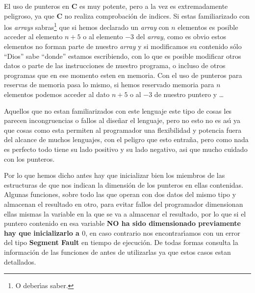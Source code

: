 El uso de punteros en \textbf{C} es muy potente, pero a la vez es extremadamente
peligroso, ya que \textbf{C} no realiza comprobaci\'on de indices. Si estas
familiarizado con los \emph{arrays} sabras\footnote{O deber\'{\i}as saber.} que
si hemos declarado un \emph{array} con $n$ elementos es posible acceder al
elemento $n+5$ o al elemento $-3$ del \emph{array}, como es obvio estos
elementos no forman parte de nuestro \emph{array} y si modificamos su contenido
s\'olo ``Dios'' sabe ``donde'' estamos escribiendo, con lo que es posible 
modificar otros datos o parte de las instrucciones de nuestro programa, o
incluso de otros programas que en ese momento esten en memoria. Con el uso
de punteros para reservas de memoria pasa lo mismo, si hemos reservado memoria
para $n$ elementos podemos acceder al dato $n+5$ o al $-3$ de nuestro puntero y
\dots \newline

Aquellos que no estan familiarizados con este lenguaje este tipo de cosas les
parecen incongruencias o fallos al dise\~nar el lenguaje, pero no esto no es
as\'{\i} ya que cosas como esta permiten al programador una flexibilidad y
potencia fuera del alcance de muchos lenguajes, con el peligro que esto 
entra\~na, pero como nada es perfecto todo tiene su lado positivo y su lado
negativo, asi que mucho cuidado con los punteros.\newline

Por lo que hemos dicho antes hay que inicializar bien los miembros de las
estructuras de \BI que nos indican la dimensi\'on de los punteros en ellas
contenidas. Algunas funciones, sobre todo las que operan con dos datos del
mismo tipo y almacenan el resultado en otro, para evitar fallos del programador
dimensionan ellas mismas la variable en la que se va a almacenar el resultado,
por lo que si el puntero contenido en esa variable \textbf{NO ha sido
dimensionado previamente hay que inicializarlo a $0$}, en caso contrario nos
encontrar\'{\i}amos con un error del tipo \textbf{Segment Fault} en tiempo de
ejecuci\'on. De todas formas consulta la informaci\'on de las funciones de
\BI antes de utilizarlas ya que estos casos estan detallados.
